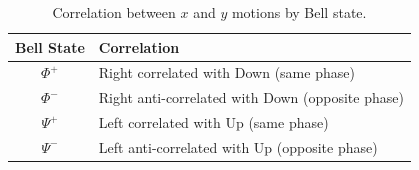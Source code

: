 \begin{table}[H]
\centering
\caption{Correlation between $x$ and $y$ motions by Bell state.}
\label{tab:correlation}
\begin{tabular}{cl}
\toprule
\textbf{Bell State} & \textbf{Correlation} \\
\midrule
$\Phi^+$ & Right correlated with Down (same phase) \\
$\Phi^-$ & Right anti-correlated with Down (opposite phase) \\
$\Psi^+$ & Left correlated with Up (same phase) \\
$\Psi^-$ & Left anti-correlated with Up (opposite phase) \\
\bottomrule
\end{tabular}
\end{table}
